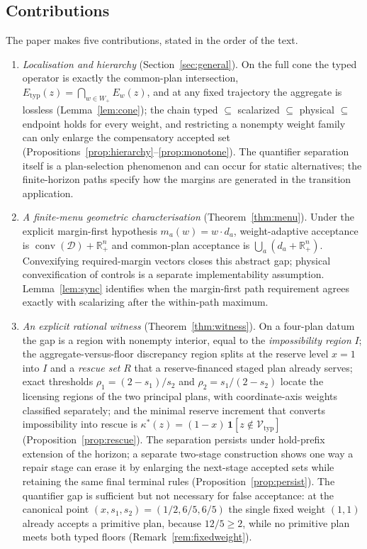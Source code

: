 \documentclass[preprint,11pt,authoryear]{elsarticle}
\theoremstyle{definition}
\theoremstyle{remark}
\newcommand{\Etyp}{E_{\mathrm{typ}}}
\newcommand{\Vtyp}{\mathcal{V}_{\mathrm{typ}}}
\newcommand{\Wp}{W_+}
\newcommand{\conv}{\operatorname{conv}}
\newcommand{\Rp}{\mathbb{R}^n_+}
\begin{document}
\pagebreak
\subsection{Contributions}

The paper makes five contributions, stated in the order of the text.
\begin{enumerate}[leftmargin=2em,label=(\roman*)]
\item \emph{Localisation and hierarchy} (Section~\ref{sec:general}). On the full cone the typed operator is exactly the common-plan intersection, $\Etyp(z)=\bigcap_{w\in\Wp}E_w(z)$, and at any fixed trajectory the aggregate is lossless (Lemma~\ref{lem:cone}); the chain typed $\subseteq$ scalarized $\subseteq$ physical $\subseteq$ endpoint holds for every weight, and restricting a nonempty weight family can only enlarge the compensatory accepted set (Propositions~\ref{prop:hierarchy}--\ref{prop:monotone}). The quantifier separation itself is a plan-selection phenomenon and can occur for static alternatives; the finite-horizon paths specify how the margins are generated in the transition application.
\item \emph{A finite-menu geometric characterisation} (Theorem~\ref{thm:menu}). Under the explicit margin-first hypothesis $m_a(w)=w\cdot d_a$, weight-adaptive acceptance is $\conv(\mathcal D)+\Rp$ and common-plan acceptance is $\bigcup_a(d_a+\Rp)$. Convexifying required-margin vectors closes this abstract gap; physical convexification of controls is a separate implementability assumption. Lemma~\ref{lem:sync} identifies when the margin-first path requirement agrees exactly with scalarizing after the within-path maximum.
\item \emph{An explicit rational witness} (Theorem~\ref{thm:witness}). On a four-plan datum the gap is a region with nonempty interior, equal to the \emph{impossibility region} $I$; the aggregate-versus-floor discrepancy region splits at the reserve level $x=1$ into $I$ and a \emph{rescue set} $R$ that a reserve-financed staged plan already serves; exact thresholds $\rho_1=(2-s_1)/s_2$ and $\rho_2=s_1/(2-s_2)$ locate the licensing regions of the two principal plans, with coordinate-axis weights classified separately; and the minimal reserve increment that converts impossibility into rescue is $\kappa^*(z)=(1-x)\,\mathbf 1[z\notin\Vtyp]$ (Proposition~\ref{prop:rescue}). The separation persists under hold-prefix extension of the horizon; a separate two-stage construction shows one way a repair stage can erase it by enlarging the next-stage accepted sets while retaining the same final terminal rules (Proposition~\ref{prop:persist}). The quantifier gap is sufficient but not necessary for false acceptance: at the canonical point $(x,s_1,s_2)=(1/2,6/5,6/5)$ the single fixed weight $(1,1)$ already accepts a primitive plan, because $12/5\ge2$, while no primitive plan meets both typed floors (Remark~\ref{rem:fixedweight}).

\end{enumerate}
\end{document}
